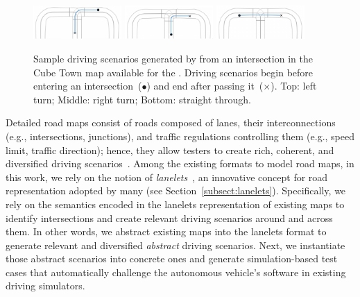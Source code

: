 \documentclass[conference]{IEEEtran}
\begin{document}
\begin{figure}[t]
  \centering
    \includegraphics[width=0.3\textwidth]{images/cubetown_1}
    \includegraphics[width=0.3\textwidth]{images/cubetown_2}
    \includegraphics[width=0.3\textwidth]{images/cubetown_3}
  \caption{Sample driving scenarios generated by \tool from an intersection in the Cube Town map available for the \challenge. Driving scenarios begin before entering an intersection~($\bullet$) and end after passing it~($\times$). Top: left turn; Middle: right turn; Bottom: straight through.}
  \label{fig:samples-cubetown}
\end{figure}

Detailed road maps consist of roads composed of lanes, their interconnections (e.g., intersections, junctions), and traffic regulations controlling them (e.g., speed limit, traffic direction); hence, they allow testers to create rich, coherent, and diversified driving scenarios~\cite{althoff2018automatic,bender2014lanelets}. 
%
Among the existing formats to model road maps, in this work, we rely on the notion of \emph{lanelets}~\cite{bender2014lanelets}, an innovative concept for road representation adopted by many (see Section~\ref{subsect:lanelets}).
%
Specifically, we rely on the semantics encoded in the lanelets representation of existing maps to identify intersections and create relevant driving scenarios around and across them. In other words, we abstract existing maps into the lanelets format to generate relevant and diversified \emph{abstract} driving scenarios. Next, we instantiate those abstract scenarios into concrete ones and generate simulation-based test cases that automatically challenge the autonomous vehicle's software in existing driving simulators.
\end{document}
